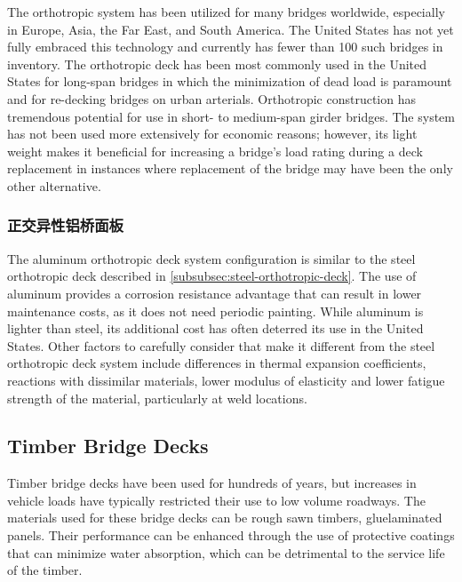 The orthotropic system has been utilized for many bridges worldwide, especially in Europe, Asia, the Far East, and South America. The United States has not yet fully embraced this technology and currently has fewer than 100 such bridges in inventory. The orthotropic deck has been most commonly used in the United States for long-span bridges in which the minimization of dead load is paramount and for re-decking bridges on urban arterials. Orthotropic construction has tremendous potential for use in short- to medium-span girder bridges. The system has not been used more extensively for economic reasons; however, its light weight makes it beneficial for increasing a bridge’s load rating during a deck replacement in instances where replacement of the bridge may have been the only other alternative.



\subsubsection{正交异性铝桥面板}
The aluminum orthotropic deck system configuration is similar to the steel orthotropic deck described in \cref{subsubsec:steel-orthotropic-deck}. The use of aluminum provides a corrosion resistance advantage that can result in lower maintenance costs, as it does not need periodic painting. While aluminum is lighter than steel, its additional cost has often deterred its use in the United States. Other factors to carefully consider that make it different from the steel orthotropic deck system include differences in thermal expansion coefficients, reactions with dissimilar materials, lower modulus of elasticity and lower fatigue strength of the material, particularly at weld locations.


\subsection{Timber Bridge Decks}

Timber bridge decks have been used for hundreds of years, but increases in vehicle loads have typically restricted their use to low volume roadways. The materials used for these bridge decks can be rough sawn timbers, gluelaminated panels. Their performance can be enhanced through the use of protective coatings that can minimize water absorption, which can be detrimental to the service life of the timber.

